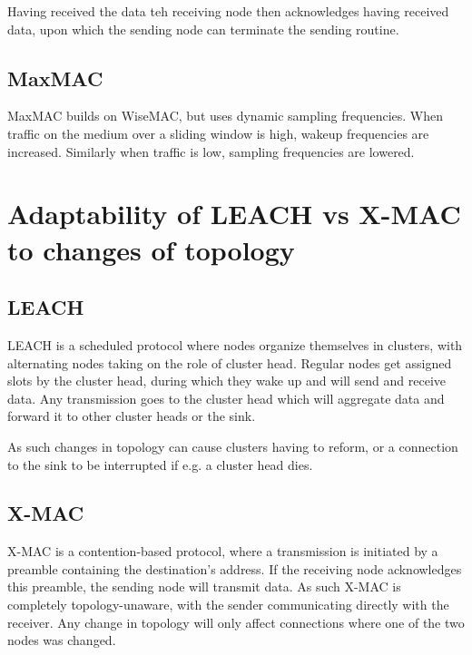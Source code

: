 \documentclass[a4paper]{scrreprt}
\begin{document}
Having received the data teh receiving node then acknowledges having received
data, upon which the sending node can terminate the sending routine.

\subsection{MaxMAC}

MaxMAC builds on WiseMAC, but uses dynamic sampling frequencies. When traffic
on the medium over a sliding window is high, wakeup frequencies are increased.
Similarly when traffic is low, sampling frequencies are lowered.

\section{Adaptability of LEACH vs X-MAC to changes of topology}

\subsection{LEACH}

LEACH is a scheduled protocol where nodes organize themselves in clusters, with
alternating nodes taking on the role of cluster head. Regular nodes get
assigned slots by the cluster head, during which they wake up and will send and
receive data. Any transmission goes to the cluster head which will aggregate
data and forward it to other cluster heads or the sink.

As such changes in topology can cause clusters having to reform, or a
connection to the sink to be interrupted if e.g. a cluster head dies.

\subsection{X-MAC}

X-MAC is a contention-based protocol, where a transmission is initiated by a
preamble containing the destination's address. If the receiving node
acknowledges this preamble, the sending node will transmit data. As such X-MAC
is completely topology-unaware, with the sender communicating directly with the
receiver. Any change in topology will only affect connections where one of the
two nodes was changed.
\end{document}
